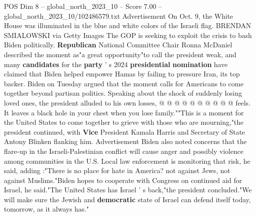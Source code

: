 \begin{textsample}{POS Dim 8 – global\_north\_2023\_10 – Score 7.00 – global\_north\_2023\_10/102486579.txt}
Advertisement On Oct. 9, the White House was illuminated in the blue and white colors of the Israeli flag.
BRENDAN SMIALOWSKI via Getty Images The GOP is seeking to exploit the crisis to bash Biden politically. \textbf{Republican} National Committee Chair Ronna McDaniel described the moment as"a great opportunity"to call the president weak, and many \textbf{candidates} for the \textbf{party} ' s 2024 \textbf{presidential} \textbf{nomination} have claimed that Biden helped empower Hamas by failing to pressure Iran, its top backer.
Biden on Tuesday argued that the moment calls for Americans to come together beyond partisan politics.
Speaking about the shock of suddenly losing loved ones, the president alluded to his own losses, @ @ @ @ @ @ @ @ @ @ feels.
It leaves a black hole in your chest when you lose family.""This is a moment for the United States to come together to grieve with those who are mourning,"the president continued, with \textbf{Vice} President Kamala Harris and Secretary of State Antony Blinken flanking him.
Advertisement Biden also noted concerns that the flare-up in the Israeli-Palestinian conflict will cause anger and possibly violence among communities in the U.S.
Local law enforcement is monitoring that risk, he said, adding :"There is no place for hate in America? not against Jews, not against Muslims."Biden hopes to cooperate with Congress on continued aid for Israel, he said."The United States has Israel ' s back,"the president concluded."We will make sure the Jewish and \textbf{democratic} state of Israel can defend itself today, tomorrow, as it always has."

\end{textsample}
